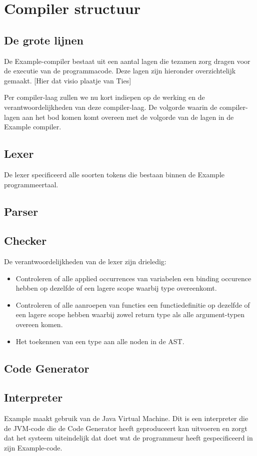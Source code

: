 \chapter{Compiler structuur}
\section{De grote lijnen}
De Example-compiler bestaat uit een aantal lagen die tezamen zorg dragen voor de executie van de programmacode. Deze lagen zijn hieronder overzichtelijk gemaakt. 
[Hier dat visio plaatje van Ties]

Per compiler-laag zullen we nu kort indiepen op de werking en de verantwoordelijkheden van deze compiler-laag. De volgorde waarin de compiler-lagen aan het bod komen komt overeen met de volgorde van de lagen in de Example compiler. 

\section{Lexer}
De lexer specificeerd alle soorten tokens die bestaan binnen de Example programmeertaal.
\section{Parser}
\section{Checker}
De verantwoordelijkheden van de lexer zijn drieledig:
\begin{itemize}
	\item Controleren of alle applied occurrences van variabelen een binding occurence hebben op dezelfde of een lagere scope waarbij type overeenkomt.
	\item Controleren of alle aanroepen van functies een functiedefinitie op dezelfde of een lagere scope hebben waarbij zowel return type als alle argument-typen overeen komen.
	\item Het toekennen van een type aan alle noden in de AST.
\end{itemize}
\section{Code Generator}
\section{Interpreter}
Example maakt gebruik van de Java Virtual Machine. Dit is een interpreter die de JVM-code die de Code Generator heeft geproduceert kan uitvoeren en zorgt dat het systeem uiteindelijk dat doet wat de programmeur heeft gespecificeerd in zijn Example-code. 
